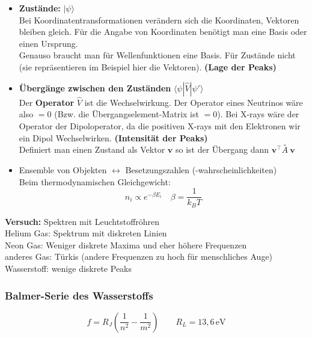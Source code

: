 \documentclass[titlepage,11pt,a4paper,ngerman]{report}
\newcommand{\tx}[1]{\textrm{#1}}
\newcommand{\versuch}[1]{\color{red!50!black} \textbf{Versuch:} \color{black} #1\\ }
\renewcommand{\vec}[1]{\boldsymbol{#1}}
\begin{document}
\begin{itemize}
	\item \textbf{Zustände:} $ |\psi \rangle $\\
	Bei Koordinatentransformationen verändern sich die Koordinaten, Vektoren bleiben gleich. Für die Angabe von Koordinaten benötigt man eine Basis oder einen Ursprung.\\
	Genauso braucht man für Wellenfunktionen eine Basis. Für Zustände nicht (sie repräsentieren im Beispiel hier die Vektoren). \textbf{(Lage der Peaks)}
	\item \textbf{Übergänge zwischen den Zuständen} $ \langle \psi | \hat{V} | \psi'\rangle $\\
	Der \textbf{Operator} $ \hat{V} $ ist die Wechselwirkung. Der Operator eines Neutrinos wäre also $ = 0 $ (Bzw. die Übergangselement-Matrix ist $ = 0 $). Bei X-rays wäre der Operator der Dipoloperator, da die positiven X-rays mit den Elektronen wir ein Dipol Wechselwirken. \textbf{(Intensität der Peaks)}\\
	Definiert man einen Zustand als Vektor $ \vec{v} $ so ist der Übergang dann $ \vec{v}^\top \overset{\circ}{A}\ \vec{v} $
	\item Ensemble von Objekten $ \leftrightarrow $ Besetzungszahlen (-wahrscheinlichkeiten) \\
	Beim thermodynamischen Gleichgewicht:
	\begin{equation*}
	n_i \propto e^{- \beta E_i} \quad \beta = \frac{1}{k_B T}
	\end{equation*}
\end{itemize}
\versuch{Spektren mit Leuchtstoffröhren}
Helium Gas: Spektrum mit diskreten Linien\\
Neon Gas: Weniger diskrete Maxima und eher höhere Frequenzen\\
anderes Gas: Türkis (andere Frequenzen zu hoch für menschliches Auge)\\
Wasserstoff: wenige diskrete Peaks

\subsubsection{Balmer-Serie des Wasserstoffs}

\begin{equation*}
f = R_J\left(\frac{1}{n^2} - \frac{1}{m^2}\right) \qquad R_L = 13{,}6 \, \tx{eV}
\end{equation*}

\end{document}
